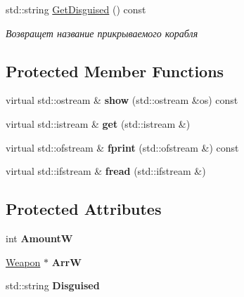 \begin{DoxyCompactItemize}
\mbox{\label{class_aircraft_carrier_group_1_1_cover_ship_a9886f32975ab712d4ea697de7cfbbed9}} 
std\+::string \mbox{\hyperlink{class_aircraft_carrier_group_1_1_cover_ship_a9886f32975ab712d4ea697de7cfbbed9}{Get\+Disguised}} () const
\begin{DoxyCompactList}\small\item\em Возвращет название прикрываемого корабля \end{DoxyCompactList}\end{DoxyCompactItemize}
\subsection*{Protected Member Functions}
\begin{DoxyCompactItemize}
\item 
\mbox{\label{class_aircraft_carrier_group_1_1_cover_ship_a837108ccd9be789089a928f4f54475a4}} 
virtual std\+::ostream \& {\bfseries show} (std\+::ostream \&os) const
\item 
\mbox{\label{class_aircraft_carrier_group_1_1_cover_ship_a36d39cc72b45e210d98fdefffc15b084}} 
virtual std\+::istream \& {\bfseries get} (std\+::istream \&)
\item 
\mbox{\label{class_aircraft_carrier_group_1_1_cover_ship_a3f5e205610aff2fe038edd191b0b0bc6}} 
virtual std\+::ofstream \& {\bfseries fprint} (std\+::ofstream \&) const
\item 
\mbox{\label{class_aircraft_carrier_group_1_1_cover_ship_a3cc135df7a5265452491cd94e0d1cc63}} 
virtual std\+::ifstream \& {\bfseries fread} (std\+::ifstream \&)
\end{DoxyCompactItemize}
\subsection*{Protected Attributes}
\begin{DoxyCompactItemize}
\item 
\mbox{\label{class_aircraft_carrier_group_1_1_cover_ship_abc0b12ad28fd72761a33cc607abcaded}} 
int {\bfseries AmountW}
\item 
\mbox{\label{class_aircraft_carrier_group_1_1_cover_ship_a6d84cddcc009457bcbf538847696cc49}} 
\mbox{\hyperlink{class_aircraft_carrier_group_1_1_weapon}{Weapon}} $\ast$ {\bfseries ArrW}
\item 
\mbox{\label{class_aircraft_carrier_group_1_1_cover_ship_aca3c78d64da40c1249f2e9360030f01b}} 
std\+::string {\bfseries Disguised}
\end{DoxyCompactItemize}
